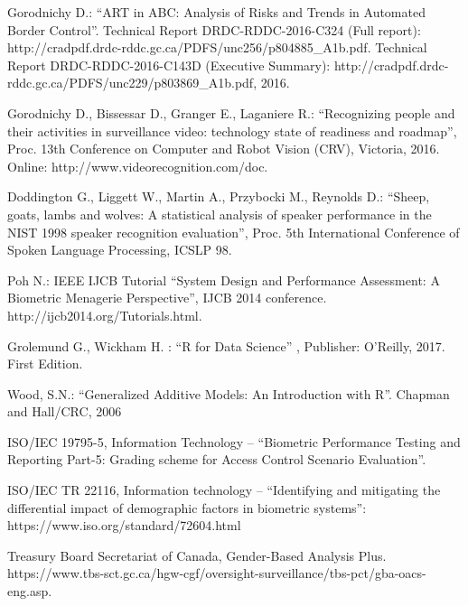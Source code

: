 \begin{thebibliography}{9}
Gorodnichy D.: ``ART in ABC: Analysis of Risks and Trends in Automated Border Control''. 
Technical Report DRDC-RDDC-2016-C324 (Full report): http://cradpdf.drdc-rddc.gc.ca/PDFS/unc256/p804885\_A1b.pdf. Technical Report  DRDC-RDDC-2016-C143D (Executive Summary): http://cradpdf.drdc-rddc.gc.ca/PDFS/unc229/p803869\_A1b.pdf, 2016. 

Gorodnichy D., Bissessar D., Granger E., Laganiere R.:   ``Recognizing people and their activities in surveillance video: technology state of readiness and roadmap'', Proc. 13th Conference on Computer and Robot Vision (CRV), Victoria, 2016. 
Online: http://www.videorecognition.com/doc.


		Doddington G., Liggett W., Martin A., Przybocki M., Reynolds D.: ``Sheep, goats, lambs and wolves: A statistical analysis of speaker performance in the NIST 1998 speaker recognition evaluation'', Proc. 5th International Conference of Spoken Language Processing, ICSLP 98. 


	Poh N.: IEEE IJCB Tutorial ``System Design and Performance Assessment: A Biometric Menagerie Perspective'', IJCB 2014 conference.  http://ijcb2014.org/Tutorials.html.  


Grolemund G., Wickham H. : ``R for Data Science'' , Publisher: O'Reilly, 2017. First Edition.	


Wood, S.N.: ``Generalized Additive Models: An Introduction with R''. Chapman and Hall/CRC, 2006 




ISO/IEC 19795-5, Information Technology -- ``Biometric Performance Testing and Reporting Part-5: Grading scheme for Access Control Scenario Evaluation''.

ISO/IEC TR 22116, Information technology -- ``Identifying and mitigating the differential impact of demographic factors in biometric systems'':
https://www.iso.org/standard/72604.html

Treasury Board Secretariat of Canada, Gender-Based Analysis Plus. https://www.tbs-sct.gc.ca/hgw-cgf/oversight-surveillance/tbs-pct/gba-oacs-eng.asp.

\end{thebibliography}